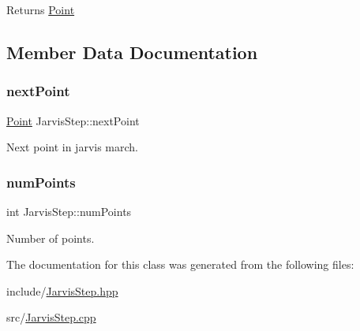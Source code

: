 \begin{DoxyReturn}{Returns}
\mbox{\hyperlink{classPoint}{Point}} 
\end{DoxyReturn}


\subsection{Member Data Documentation}
\mbox{\label{classJarvisStep_a503a36c2f9fcd1bcb7a88b46849142fc}} 
\subsubsection{\texorpdfstring{next\+Point}{nextPoint}}
{\footnotesize\ttfamily \mbox{\hyperlink{classPoint}{Point}} Jarvis\+Step\+::next\+Point\hspace{0.3cm}{\ttfamily [private]}}



Next point in jarvis march. 

\mbox{\label{classJarvisStep_a7616fe9780bd2285b3d01b8262d719bb}} 
\subsubsection{\texorpdfstring{num\+Points}{numPoints}}
{\footnotesize\ttfamily int Jarvis\+Step\+::num\+Points\hspace{0.3cm}{\ttfamily [private]}}



Number of points. 



The documentation for this class was generated from the following files\+:\begin{DoxyCompactItemize}
\item 
include/\mbox{\hyperlink{JarvisStep_8hpp}{Jarvis\+Step.\+hpp}}\item 
src/\mbox{\hyperlink{JarvisStep_8cpp}{Jarvis\+Step.\+cpp}}\end{DoxyCompactItemize}
